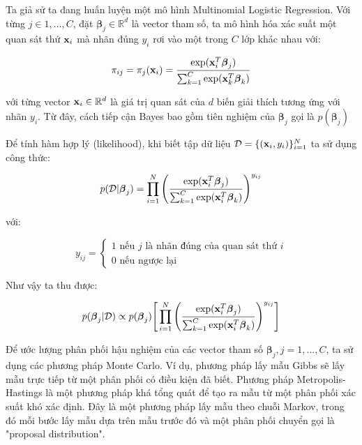 Ta giả sử ta đang huấn luyện một mô hình Multinomial Logistic Regression.
Với từng $j \in 1, \dots, C$, đặt $\boldsymbol{\beta}_j \in \mathbb{R}^d$ là vector tham số, ta mô hình hóa xác suất một quan sát thứ $\bold{x}_i$ mà nhãn đúng $y_i$ rơi vào một trong $C$ lớp khác nhau với:

\begin{equation*}
    \pi_{ij} = \pi_j (\bold{x}_i) = \dfrac{\exp (\bold{x}_i^T \boldsymbol{\beta}_j)}{\sum_{k=1}^C \exp (\bold{x}_k^T \boldsymbol{\beta}_k)}
\end{equation*}

với từng vector $\bold{x}_i \in \mathbb{R}^d$ là giá trị quan sát của $d$ biến giải thích tương ứng với nhãn $y_i$.
Từ đây, cách tiếp cận Bayes bao gồm tiên nghiệm của $\boldsymbol{\beta}_j$ gọi là $p(\boldsymbol{\beta}_j)$

Để tính hàm hợp lý (likelihood), khi biết tập dữ liệu $\mathcal{D} = \lbrace (\bold{x}_i, y_i) \rbrace_{i=1}^N$ ta sử dụng công thức:

\begin{equation*}
    p(\mathcal{D} \vert \boldsymbol{\beta}_j) = \prod_{i=1}^{N} \Bigg( \dfrac{\exp(\bold{x}_i^T \boldsymbol{\beta}_j) }{\sum_{k=1}^C \exp(\bold{x}_i^T \boldsymbol{\beta}_k)} \Bigg)^{y_{ij}}
\end{equation*}

với: 

\begin{equation*}
    y_{ij} = \begin{cases}
        1 \text{ nếu } j \text{ là nhãn đúng của quan sát thứ } i \\
        0 \text{ nếu ngược lại}
    \end{cases}
\end{equation*}

Như vậy ta thu được:

\begin{equation*}
    p(\boldsymbol{\beta}_j \vert \mathcal{D}) \propto p(\boldsymbol{\beta}_j) \Bigg \lbrack \prod_{i=1}^{N} \Bigg( \dfrac{\exp(\bold{x}_i^T \boldsymbol{\beta}_j) }{\sum_{k=1}^C \exp(\bold{x}_i^T \boldsymbol{\beta}_k)} \Bigg)^{y_{ij}} \Bigg \rbrack
\end{equation*}

Để ước lượng phân phối hậu nghiệm của các vector tham số $\boldsymbol{\beta}_j, j=1, \dots, C$, ta sử dụng các phương pháp Monte Carlo.
Ví dụ, phương pháp lấy mẫu Gibbs sẽ lấy mẫu trực tiếp từ một phân phối có điều kiện đã biết.
Phương pháp Metropolis-Hastings là một phương pháp khá tổng quát để tạo ra mẫu từ một phân phối xác suất khó xác định.
Đây là một phương pháp lấy mẫu theo chuỗi Markov, trong đó mỗi bước lấy mẫu dựa trên mẫu trước đó và một phân phối chuyển gọi là "proposal distribution".


